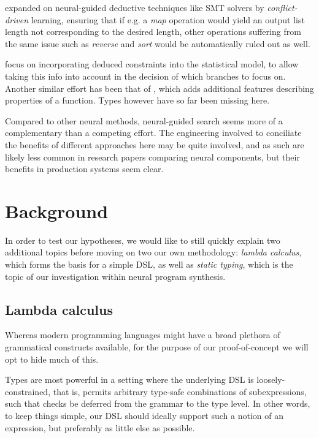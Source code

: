 \documentclass{article}
\begin{document}
\citet{feng2018program} expanded on neural-guided deductive techniques
like SMT solvers by \emph{conflict-driven} learning,
ensuring that if e.g. a \emph{map} operation would yield an
output list length not corresponding to the desired length,
other operations suffering from the same issue such as
\emph{reverse} and \emph{sort} would be automatically ruled out as well.

\citet{zhang2018leveraging} focus on incorporating deduced constraints
into the statistical model, to allow taking this info into account
in the decision of which branches to focus on.
Another similar effort has been that of \citet{odena2020learning},
which adds additional features describing properties of a function.
Types however have so far been missing here.

Compared to other neural methods, neural-guided search seems
more of a complementary than a competing effort.
The engineering involved to conciliate the benefits of
different approaches here may be quite involved, and as such
are likely less common in research papers comparing neural components,
but their benefits in production systems seem clear.

\section{Background} %

In order to test our hypotheses,
we would like to still quickly explain two additional topics before moving on two our own methodology:
\emph{lambda calculus}, which forms the basis for a simple DSL,
as well as \emph{static typing},
which is the topic of our investigation within neural program synthesis.

\subsection{Lambda calculus} \label{sec:lambdacalc}

Whereas modern programming languages might have a broad plethora of grammatical constructs available,
for the purpose of our proof-of-concept we will opt to hide much of this.

Types are most powerful in a setting where the underlying DSL is loosely-constrained,
that is, permits arbitrary type-safe combinations of subexpressions,
such that checks be deferred from the grammar to the type level.
In other words, to keep things simple,
our DSL should ideally support such a notion of an expression,
but preferably as little else as possible.
\end{document}
